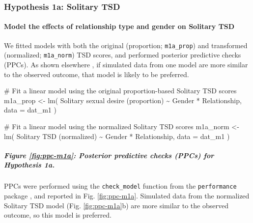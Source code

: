\documentclass[
  bookmarksnumbered]{article}
\newenvironment{Shaded}{\begin{snugshade}}{\end{snugshade}}
\newcommand{\AttributeTok}[1]{\textcolor[rgb]{0.80,0.80,0.80}{#1}}
\newcommand{\CommentTok}[1]{\textcolor[rgb]{0.50,0.62,0.50}{#1}}
\newcommand{\FunctionTok}[1]{\textcolor[rgb]{0.94,0.94,0.56}{#1}}
\newcommand{\NormalTok}[1]{\textcolor[rgb]{0.80,0.80,0.80}{#1}}
\newcommand{\OtherTok}[1]{\textcolor[rgb]{0.94,0.94,0.56}{#1}}
\newcommand{\SpecialCharTok}[1]{\textcolor[rgb]{0.86,0.64,0.64}{#1}}
\newcommand{\StringTok}[1]{\textcolor[rgb]{0.80,0.58,0.58}{#1}}
\begin{document}
\subsubsection{Hypothesis 1a: Solitary TSD}\label{hypothesis1a}

\paragraph{Model the effects of relationship type and gender on Solitary TSD}\label{model-the-effects-of-relationship-type-and-gender-on-solitary-tsd}

We fitted models with both the original (proportion; \texttt{m1a\_prop}) and transformed (normalized; \texttt{m1a\_norm}) TSD scores, and performed posterior predictive checks (PPCs). As shown elsewhere \autocite[e.g.,][]{gabryVisualizationBayesianWorkflow2019}, if simulated data from one model are more similar to the observed outcome, that model is likely to be preferred.

\begin{Shaded}
\begin{Highlighting}[]
\CommentTok{\# Fit a linear model using the original proportion{-}based Solitary TSD scores}
\NormalTok{m1a\_prop }\OtherTok{\textless{}{-}} \FunctionTok{lm}\NormalTok{(}
  \StringTok{\textasciigrave{}}\AttributeTok{Solitary sexual desire (proportion)}\StringTok{\textasciigrave{}} \SpecialCharTok{\textasciitilde{}}\NormalTok{ Gender }\SpecialCharTok{*}\NormalTok{ Relationship,}
  \AttributeTok{data =}\NormalTok{ dat\_m1}
\NormalTok{)}

\CommentTok{\# Fit a linear model using the normalized Solitary TSD scores}
\NormalTok{m1a\_norm }\OtherTok{\textless{}{-}} \FunctionTok{lm}\NormalTok{(}
  \StringTok{\textasciigrave{}}\AttributeTok{Solitary TSD (normalized)}\StringTok{\textasciigrave{}} \SpecialCharTok{\textasciitilde{}}\NormalTok{ Gender }\SpecialCharTok{*}\NormalTok{ Relationship,}
  \AttributeTok{data =}\NormalTok{ dat\_m1}
\NormalTok{)}
\end{Highlighting}
\end{Shaded}

\subparagraph{Figure \ref{fig:ppc-m1a}: Posterior predictive checks (PPCs) for Hypothesis 1a.}\label{figure-reffigppc-m1a-posterior-predictive-checks-ppcs-for-hypothesis-1a.}

PPCs were performed using the \texttt{check\_model} function from the \texttt{performance} package \autocite{ludecke2021}, and reported in Fig. \ref{fig:ppc-m1a}. Simulated data from the normalized Solitary TSD model (Fig. \ref{fig:ppc-m1a}b) are more similar to the observed outcome, so this model is preferred.
\end{document}

